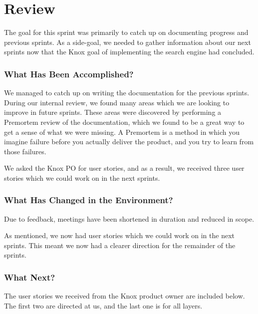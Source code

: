 \section{Review}
The goal for this sprint was primarily to catch up on documenting progress and previous sprints. As a side-goal, we needed to gather information about our next sprints now that the Knox goal of implementing the search engine had concluded.

\subsubsection*{What Has Been Accomplished?}
We managed to catch up on writing the documentation for the previous sprints. During our internal review, we found many areas which we are looking to improve in future sprints. These areas were discovered by performing a Premortem review of the documentation, which we found to be a great way to get a sense of what we were missing. A Premortem is a method in which you imagine failure before you actually deliver the product, and you try to learn from those failures\cite{PremortemSadanForbedrer}.

We asked the Knox PO for user stories, and as a result, we received three user stories which we could work on in the next sprints.

\subsubsection*{What Has Changed in the Environment?}
Due to feedback, meetings have been shortened in duration and reduced in scope. 

As mentioned, we now had user stories which we could work on in the next sprints. This meant we now had a clearer direction for the remainder of the sprints.

\subsubsection*{What Next?}
The user stories we received from the Knox product owner are included below. The first two are directed at us, and the last one is for all \knox{} layers.



